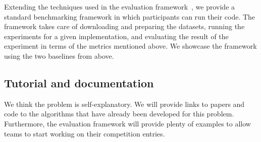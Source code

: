 Extending the techniques used in the evaluation framework~\cite{Benchmark}, 
we provide a standard benchmarking framework in which participants can 
run their code.
The framework takes care of downloading and preparing the datasets,
running the experiments for a given implementation, 
and evaluating the result of the experiment in terms of the metrics mentioned above.
We showcase the framework using the two baselines from above.




\subsection{Tutorial and documentation}

We think the problem is self-explanatory. We will provide links to
papers and code to the algorithms that have already been developed for this
problem. Furthermore, the evaluation framework will provide plenty 
of examples to allow teams to start working on their competition entries.



